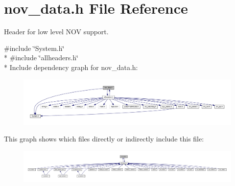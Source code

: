 \hypertarget{a00022}{\section{nov\+\_\+data.\+h File Reference}
\label{a00022}
}


Header for low level N\+O\+V support.  


{\ttfamily \#include \char`\"{}System.\+h\char`\"{}}\\*
{\ttfamily \#include \char`\"{}allheaders.\+h\char`\"{}}\\*
Include dependency graph for nov\+\_\+data.\+h\+:\nopagebreak
\begin{figure}[H]
\begin{center}
\leavevmode
\includegraphics[width=350pt]{de/d4e/a00972}
\end{center}
\end{figure}
This graph shows which files directly or indirectly include this file\+:\nopagebreak
\begin{figure}[H]
\begin{center}
\leavevmode
\includegraphics[width=350pt]{d3/da5/a00973}
\end{center}
\end{figure}
